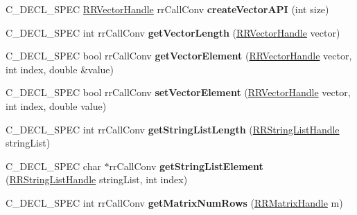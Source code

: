 \begin{DoxyCompactItemize}
\item 
\hypertarget{group__loadsave_ga27e208d44bda0c744c9df5906b51cf09}{
\-C\-\_\-\-D\-E\-C\-L\-\_\-\-S\-P\-E\-C \hyperlink{rr__c__types_8h_aea46a16752b0ae2cd95c009030ee630e}{\-R\-R\-Vector\-Handle} \*
rr\-Call\-Conv {\bfseries create\-Vector\-A\-P\-I} (int size)}
\label{group__loadsave_ga27e208d44bda0c744c9df5906b51cf09}

\item 
\hypertarget{group__loadsave_ga0c42e94111a64ea70824f92d8c1b564d}{
\-C\-\_\-\-D\-E\-C\-L\-\_\-\-S\-P\-E\-C int rr\-Call\-Conv {\bfseries get\-Vector\-Length} (\hyperlink{rr__c__types_8h_aea46a16752b0ae2cd95c009030ee630e}{\-R\-R\-Vector\-Handle} vector)}
\label{group__loadsave_ga0c42e94111a64ea70824f92d8c1b564d}

\item 
\hypertarget{group__loadsave_gaf06c28a1e29d86f3fd3e6112eb7c85e8}{
\-C\-\_\-\-D\-E\-C\-L\-\_\-\-S\-P\-E\-C bool rr\-Call\-Conv {\bfseries get\-Vector\-Element} (\hyperlink{rr__c__types_8h_aea46a16752b0ae2cd95c009030ee630e}{\-R\-R\-Vector\-Handle} vector, int index, double \&value)}
\label{group__loadsave_gaf06c28a1e29d86f3fd3e6112eb7c85e8}

\item 
\hypertarget{group__loadsave_ga77eaf0d0f88175ce4e2e8ca57ff9d859}{
\-C\-\_\-\-D\-E\-C\-L\-\_\-\-S\-P\-E\-C bool rr\-Call\-Conv {\bfseries set\-Vector\-Element} (\hyperlink{rr__c__types_8h_aea46a16752b0ae2cd95c009030ee630e}{\-R\-R\-Vector\-Handle} vector, int index, double value)}
\label{group__loadsave_ga77eaf0d0f88175ce4e2e8ca57ff9d859}

\item 
\hypertarget{group__loadsave_ga451b4f6fe1d5aaabfdd11acb44f124bb}{
\-C\-\_\-\-D\-E\-C\-L\-\_\-\-S\-P\-E\-C int rr\-Call\-Conv {\bfseries get\-String\-List\-Length} (\hyperlink{rr__c__types_8h_abf561b014879247b7b92ee99c205de21}{\-R\-R\-String\-List\-Handle} string\-List)}
\label{group__loadsave_ga451b4f6fe1d5aaabfdd11acb44f124bb}

\item 
\hypertarget{group__loadsave_gac305395b75de8e66270d552492ff7df0}{
\-C\-\_\-\-D\-E\-C\-L\-\_\-\-S\-P\-E\-C char $\ast$rr\-Call\-Conv {\bfseries get\-String\-List\-Element} (\hyperlink{rr__c__types_8h_abf561b014879247b7b92ee99c205de21}{\-R\-R\-String\-List\-Handle} string\-List, int index)}
\label{group__loadsave_gac305395b75de8e66270d552492ff7df0}

\item 
\hypertarget{group__loadsave_gad5a3803c72d8f27bf2dad72b25226675}{
\-C\-\_\-\-D\-E\-C\-L\-\_\-\-S\-P\-E\-C int rr\-Call\-Conv {\bfseries get\-Matrix\-Num\-Rows} (\hyperlink{rr__c__types_8h_a87174eefa58ae98dec58c9253ae6c5da}{\-R\-R\-Matrix\-Handle} m)}
\label{group__loadsave_gad5a3803c72d8f27bf2dad72b25226675}


\end{DoxyCompactItemize}
